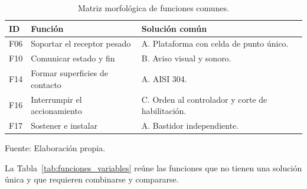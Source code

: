 \begin{table}[H]
    \centering
    \caption{Matriz morfológica de funciones comunes.}
    \label{tab:funciones_comunes}
    \footnotesize
    \renewcommand{\arraystretch}{1.15}
    \begin{tabularx}{\textwidth}{p{}p{}X}
        \toprule
        \textbf{ID} & \textbf{Función} & \textbf{Solución común} \\
        \midrule
        F06 & Soportar el receptor pesado & A. Plataforma con celda de punto único. \\
        F10 & Comunicar estado y fin & B. Aviso visual y sonoro. \\
        F14 & Formar superficies de contacto & A. AISI 304. \\
        F16 & Interrumpir el accionamiento & C. Orden al controlador y corte de habilitación. \\
        F17 & Sostener e instalar & A. Bastidor independiente. \\
        \bottomrule
    \end{tabularx}
    \par\smallskip
    Fuente: Elaboración propia.
\end{table}
La Tabla~\ref{tab:funciones_variables} reúne las funciones que no tienen
una solución única y que requieren combinarse y compararse.


